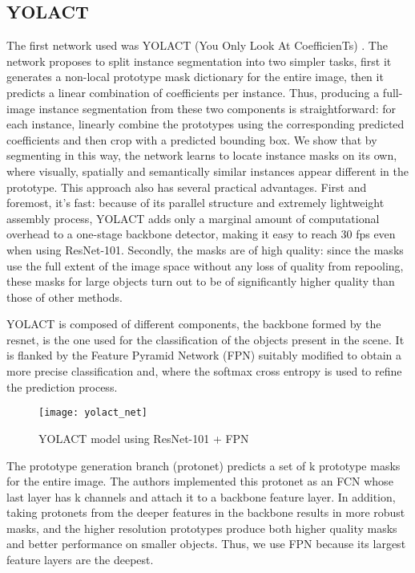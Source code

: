 \subsection{YOLACT}
The first network used was YOLACT (You Only Look At CoefficienTs) \cite{bolya2019yolact}. The network proposes to split instance segmentation into two simpler tasks,
first it generates a non-local prototype mask dictionary for the entire image, then it predicts a linear combination of coefficients per instance. Thus, producing
a full-image instance segmentation from these two components is straightforward: for each instance, linearly combine the prototypes using the corresponding
predicted coefficients and then crop with a predicted bounding box. We show that by segmenting in this way, the network learns to locate instance masks on its own,
where visually, spatially and semantically similar instances appear different in the prototype. This approach also has several practical advantages.
First and foremost, it’s fast: because of its parallel structure and extremely lightweight assembly process, YOLACT adds only a marginal amount of computational overhead to
a one-stage backbone detector, making it easy to reach 30 fps even when using ResNet-101. Secondly, the masks are of high quality: since the masks use the full extent of
the image space without any loss of quality from repooling, these masks for large objects turn out to be of significantly higher quality than those of other methods.

YOLACT is composed of different components, the backbone formed by the resnet, is the one used for the classification of the objects present in the scene.
It is flanked by the Feature Pyramid Network (FPN) suitably modified to obtain a more precise classification and, where the softmax cross entropy is used to refine
the prediction process.

\begin{figure}[h]
    \centering
    \texttt{[image: yolact\_net]} 
    \caption{YOLACT model using ResNet-101 + FPN}
\end{figure}

The prototype generation branch (protonet) predicts a set of k prototype masks for the entire image. The authors implemented this protonet as an FCN whose last layer
has k channels and attach it to a backbone feature layer. In addition, taking protonets from the deeper features in the backbone results in more robust masks, and the
higher resolution prototypes produce both higher quality masks and better performance on smaller objects. Thus, we use FPN because its largest feature layers are the deepest.

